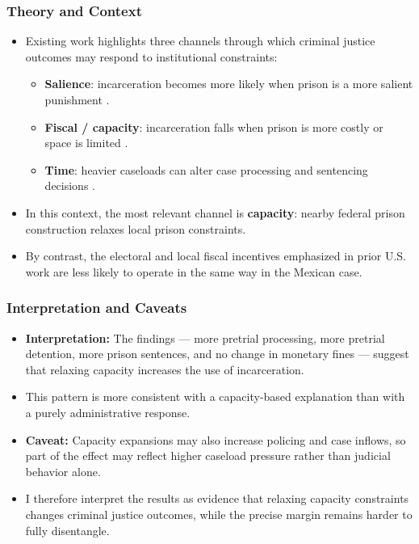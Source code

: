 \documentclass[10pt,aspectratio=169]{beamer}
\begin{document}
\begin{frame}
\frametitle{Theory and Context}
\small
\begin{itemize}\setlength\itemsep{0.7em}
    
    \item Existing work highlights three channels through which criminal justice outcomes may respond to institutional constraints:
    \begin{itemize}\setlength\itemsep{0.5em}
        \item \textbf{Salience}: incarceration becomes more likely when prison is a more salient punishment {\footnotesize\color{gray}\citep{Galinato-2020}.}
        \item \textbf{Fiscal / capacity}: incarceration falls when prison is more costly or space is limited {\footnotesize\color{gray}\citep{Ouss-Incentives}.}
        \item \textbf{Time}: heavier caseloads can alter case processing and sentencing decisions {\footnotesize\color{gray}\citep{Yang-Resource-AEJ}.}
    \end{itemize}
    \pause
    
    \item In this context, the most relevant channel is \textbf{capacity}: nearby federal prison construction relaxes local prison constraints.
    \pause
    
    \item By contrast, the electoral and local fiscal incentives emphasized in prior U.S. work are less likely to operate in the same way in the Mexican case.
\end{itemize}
\end{frame}

\begin{frame}
\frametitle{Interpretation and Caveats}
\small
\begin{itemize}\setlength\itemsep{0.7em}
    
    \item \textbf{Interpretation:} The findings --- more pretrial processing, more pretrial detention, more prison sentences, and no change in monetary fines --- suggest that relaxing capacity increases the use of incarceration.
    \pause
    
    \item This pattern is more consistent with a capacity-based explanation than with a purely administrative response.
    \pause
    
    \item \textbf{Caveat:} Capacity expansions may also increase policing and case inflows, so part of the effect may reflect higher caseload pressure rather than judicial behavior alone.
    \pause
    
    \item I therefore interpret the results as evidence that relaxing capacity constraints changes criminal justice outcomes, while the precise margin remains harder to fully disentangle.
\end{itemize}
\end{frame}
\end{document}
